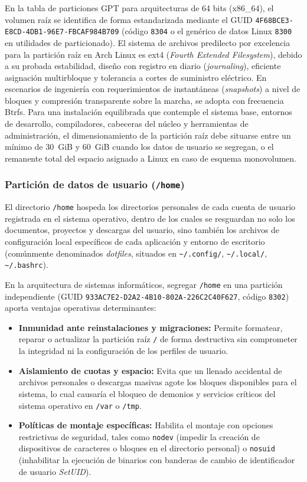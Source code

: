 \documentclass[12pt]{article}
\begin{document}
En la tabla de particiones GPT para arquitecturas de 64 bits (x86\_64), el volumen raíz se identifica de forma estandarizada mediante el GUID \texttt{4F68BCE3-E8CD-4DB1-96E7-FBCAF984B709} (código \texttt{8304} o el genérico de datos Linux \texttt{8300} en utilidades de particionado). El sistema de archivos predilecto por excelencia para la partición raíz en Arch Linux es ext4 (\textit{Fourth Extended Filesystem}), debido a su probada estabilidad, diseño con registro en diario (\textit{journaling}), eficiente asignación multirbloque y tolerancia a cortes de suministro eléctrico. En escenarios de ingeniería con requerimientos de instantáneas (\textit{snapshots}) a nivel de bloques y compresión transparente sobre la marcha, se adopta con frecuencia Btrfs. Para una instalación equilibrada que contemple el sistema base, entornos de desarrollo, compiladores, cabeceras del núcleo y herramientas de administración, el dimensionamiento de la partición raíz debe situarse entre un mínimo de 30~GiB y 60~GiB cuando los datos de usuario se segregan, o el remanente total del espacio asignado a Linux en caso de esquema monovolumen.

\subsubsection{Partición de datos de usuario (\texttt{/home})}

El directorio \texttt{/home} hospeda los directorios personales de cada cuenta de usuario registrada en el sistema operativo, dentro de los cuales se resguardan no solo los documentos, proyectos y descargas del usuario, sino también los archivos de configuración local específicos de cada aplicación y entorno de escritorio (comúnmente denominados \textit{dotfiles}, situados en \texttt{\~{}/.config/}, \texttt{\~{}/.local/}, \texttt{\~{}/.bashrc}).

En la arquitectura de sistemas informáticos, segregar \texttt{/home} en una partición independiente (GUID \texttt{933AC7E2-D2A2-4B10-802A-226C2C40F627}, código \texttt{8302}) aporta ventajas operativas determinantes:
\begin{itemize}[noitemsep, topsep=2pt]
    \item \textbf{Inmunidad ante reinstalaciones y migraciones:} Permite formatear, reparar o actualizar la partición raíz \texttt{/} de forma destructiva sin comprometer la integridad ni la configuración de los perfiles de usuario.
    \item \textbf{Aislamiento de cuotas y espacio:} Evita que un llenado accidental de archivos personales o descargas masivas agote los bloques disponibles para el sistema, lo cual causaría el bloqueo de demonios y servicios críticos del sistema operativo en \texttt{/var} o \texttt{/tmp}.
    \item \textbf{Políticas de montaje específicas:} Habilita el montaje con opciones restrictivas de seguridad, tales como \texttt{nodev} (impedir la creación de dispositivos de caracteres o bloques en el directorio personal) o \texttt{nosuid} (inhabilitar la ejecución de binarios con banderas de cambio de identificador de usuario \textit{SetUID}).
\end{itemize}
\end{document}
